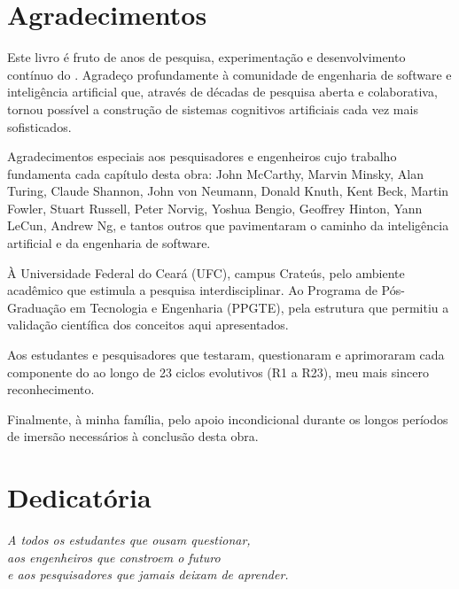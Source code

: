 
\chapter*{Agradecimentos}
\label{ch:agradecimentos}

Este livro é fruto de anos de pesquisa, experimentação e desenvolvimento 
contínuo do \opencodeeco{}. Agradeço profundamente à comunidade de 
engenharia de software e inteligência artificial que, através de décadas 
de pesquisa aberta e colaborativa, tornou possível a construção de 
sistemas cognitivos artificiais cada vez mais sofisticados.

Agradecimentos especiais aos pesquisadores e engenheiros cujo trabalho 
fundamenta cada capítulo desta obra: John McCarthy, Marvin Minsky, 
Alan Turing, Claude Shannon, John von Neumann, Donald Knuth, Kent Beck, 
Martin Fowler, Stuart Russell, Peter Norvig, Yoshua Bengio, Geoffrey 
Hinton, Yann LeCun, Andrew Ng, e tantos outros que pavimentaram o 
caminho da inteligência artificial e da engenharia de software.

À Universidade Federal do Ceará (UFC), campus Crateús, pelo ambiente 
acadêmico que estimula a pesquisa interdisciplinar. Ao Programa de 
Pós-Graduação em Tecnologia e Engenharia (PPGTE), pela estrutura 
que permitiu a validação científica dos conceitos aqui apresentados.

Aos estudantes e pesquisadores que testaram, questionaram e aprimoraram 
cada componente do \opencodeeco{} ao longo de 23 ciclos evolutivos 
(R1 a R23), meu mais sincero reconhecimento.

Finalmente, à minha família, pelo apoio incondicional durante os 
longos períodos de imersão necessários à conclusão desta obra.

\chapter*{Dedicatória}
\label{ch:dedicatoria}

\vspace*{\fill}
\begin{flushright}
\textit{A todos os estudantes que ousam questionar,\\
aos engenheiros que constroem o futuro\\
e aos pesquisadores que jamais deixam de aprender.}
\end{flushright}
\vspace*{\fill}

